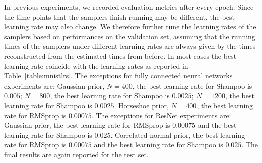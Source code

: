\documentclass[10pt]{article} %
\theoremstyle{plain}
\theoremstyle{definition}
\theoremstyle{remark}
\begin{document}
In previous experiments, we recorded evaluation metrics after every epoch. Since the time points that the samplers finish running may be different, the best learning rate may also change. We therefore further tune the learning rates of the samplers based on performances on the validation set, assuming that the running times of the samplers under different learning rates are always given by the times reconstructed from the estimated times from before. 
In most cases the best learning rate coincide with the learning rates as reported in Table~\ref{table:mnistlrs}. The exceptions for fully connected neural networks experiments are: Gaussian prior, $N=400$, the best learning rate for Shampoo is $0.005$; $N=800$, the best learning rate for Shampoo is $0.0025$; $N=1200$, the best learning rate for Shampoo is $0.0025$. Horseshoe prior, $N=400$, the best learning rate for RMSprop is $0.00075$. The exceptions for ResNet experiments are: Gaussian prior, the best learning rate for RMSprop is $0.00075$ and the best learning rate for Shampoo is $0.025$. Correlated normal prior, the best learning rate for RMSprop is $0.00075$ and the best learning rate for Shampoo is $0.025$. The final results are again reported for the test set.
\end{document}
